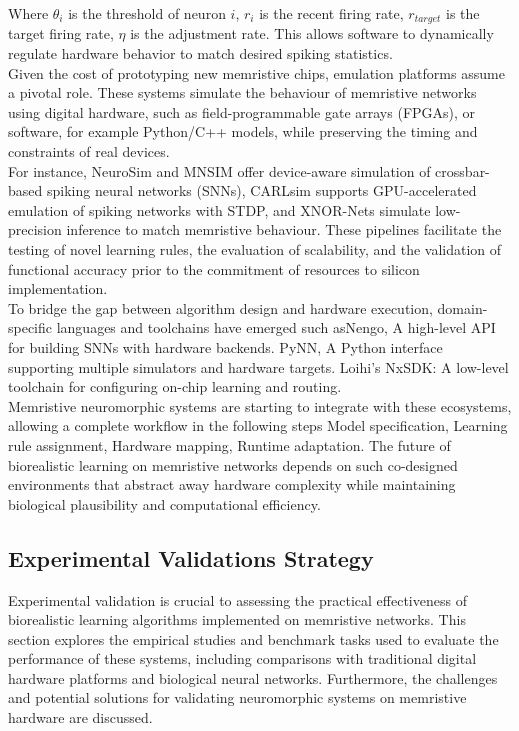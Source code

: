 \noindent Where $\theta_i$ is the threshold of neuron $i$, $r_i$ is the recent firing rate, $r_{target}$ is the target firing rate, $\eta$ is the adjustment rate. This allows software to dynamically regulate hardware behavior to match desired spiking statistics.\\

\noindent Given the cost of prototyping new memristive chips, emulation platforms assume a pivotal role. These systems simulate the behaviour of memristive networks using digital hardware, such as field-programmable gate arrays (FPGAs), or software, for example Python/C++ models, while preserving the timing and constraints of real devices. \\

\noindent For instance, NeuroSim and MNSIM offer device-aware simulation of crossbar-based spiking neural networks (SNNs), CARLsim supports GPU-accelerated emulation of spiking networks with STDP, and XNOR-Nets simulate low-precision inference to match memristive behaviour. These pipelines facilitate the testing of novel learning rules, the evaluation of scalability, and the validation of functional accuracy prior to the commitment of resources to silicon implementation.\\

\noindent To bridge the gap between algorithm design and hardware execution, domain-specific languages and toolchains have emerged such asNengo, A high-level API for building SNNs with hardware backends. PyNN, A Python interface supporting multiple simulators and hardware targets. Loihi's NxSDK: A low-level toolchain for configuring on-chip learning and routing. \\

\noindent Memristive neuromorphic systems are starting to integrate with these ecosystems, allowing a complete workflow in the following steps Model specification, Learning rule assignment, Hardware mapping, Runtime adaptation. The future of biorealistic learning on memristive networks depends on such co-designed environments that abstract away hardware complexity while maintaining biological plausibility and computational efficiency.

\subsection[Experimental Validations Strategy]{Experimental Validations Strategy}

Experimental validation is crucial to assessing the practical effectiveness of biorealistic learning algorithms implemented on memristive networks. This section explores the empirical studies and benchmark tasks used to evaluate the performance of these systems, including comparisons with traditional digital hardware platforms and biological neural networks. Furthermore, the challenges and potential solutions for validating neuromorphic systems on memristive hardware are discussed. \\

